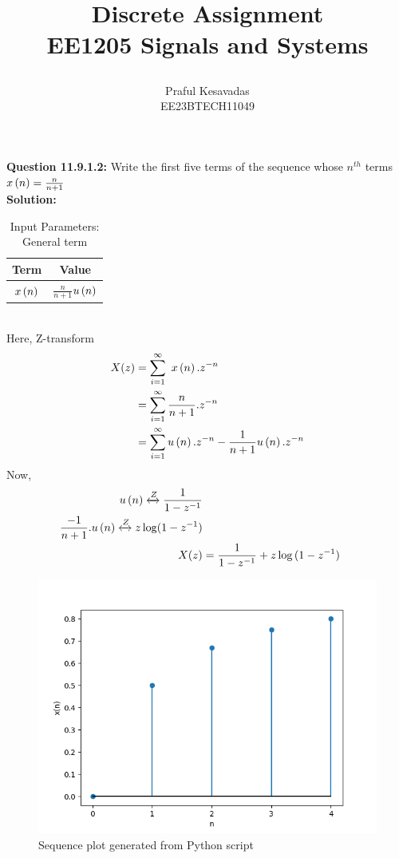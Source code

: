 \documentclass{article}
\begin{document}
\title{
\Huge\textbf{Discrete Assignment}\\
\Huge\textbf{EE1205} Signals and Systems\\
\date{}
}
\large\author{Praful Kesavadas\\EE23BTECH11049}
\maketitle

\textbf{Question 11.9.1.2:}
Write the first five terms of the sequence whose $n^{th}$ terms  $x\left(n\right) = \frac{n}{n+1}$\\
\textbf{Solution:}
\begin{table}[ht]
  \centering
  \begin{tabular}{|c|c|}
    \hline
    \textbf{Term} & \textbf{Value} \\
    \hline
    $x\left(n\right)$ & $\frac{n}{n+1}$$u\left(n\right)$ \\
    \hline
  \end{tabular}
  \caption{Input Parameters: General term}
\end{table}\\
Here, Z-transform
\begin{align}
X(z) &= \sum_{i=1}^\infty\ x\left(n\right).z^{-n}\\
&= \sum_{i=1}^\infty \frac{n}{n+1} . z^{-n}\\
&= \sum_{i=1}^\infty u\left(n\right).z^{-n} - \frac{1}{n+1} u\left(n\right).z^{-n}
\end{align}
Now, 
\begin{align}
u\left(n\right) \xleftrightarrow Z  \frac{1}{1-z^{-1}}\\
\frac{-1}{n+1}.u\left(n\right) \xleftrightarrow Z  z\log(1-z^{-1})\\
X(z) &= \frac{1}{1-z^{-1}} + z\log{(1-z^{-1})}\
\end{align}
\begin{figure}[h]
    \centering
    \includegraphics[width=\columnwidth]{figs/graph1.png}
    \caption{Sequence plot generated from Python script}
    \label{fig:sequence-plot}
\end{figure}
\end{document}
